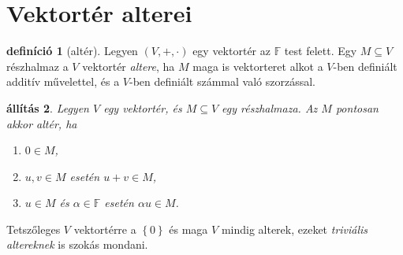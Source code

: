 \documentclass[9pt, a4paper, showtrims]{memoir}
\theoremstyle{plain}
\newtheorem{proposition}{állítás}[chapter]
\theoremstyle{remark}
\theoremstyle{definition}
\newtheorem{definition}[proposition]{definíció}
\begin{document}
\section{Vektortér alterei}
\begin{definition}[altér]
	Legyen $\left( V,+,\cdot \right)$ egy vektortér az $\mathbb{F}$ test felett.
	Egy $M\subseteq V$ részhalmaz a $V$ vektortér \emph{altere},
	ha $M$ maga is vektorteret alkot a $V$-ben definiált additív művelettel,
	és a $V$-ben definiált számmal való szorzással.
\end{definition}
\begin{proposition}
	Legyen $V$ egy vektortér, és $M\subseteq V$ egy részhalmaza.
	Az $M$ pontosan akkor altér,
	ha
	\begin{enumerate}
		\item $0\in M$,
		\item $u,v\in M$ esetén $u+v\in M$,
		\item $u\in M$ és $\alpha\in\mathbb{F}$ esetén $\alpha u\in M$.\qedhere
	\end{enumerate}
\end{proposition}
Tetszőleges $V$ vektortérre a $\left\{ 0 \right\}$ és maga $V$ mindig alterek,
ezeket \emph{triviális altereknek} is szokás mondani.
\end{document}
